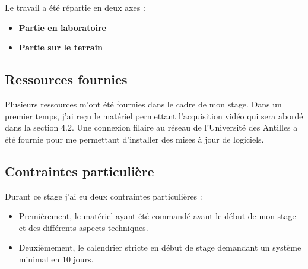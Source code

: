     \begin{flushleft}
        Le travail a été répartie en deux axes :
        \begin{itemize}
            \item  \textbf{Partie en laboratoire}
            \item  \textbf{Partie sur le terrain}
        \end{itemize}
        
        \vspace{0.5cm}      
    \end{flushleft}

    \subsection{Ressources fournies}
    Plusieurs ressources m'ont été fournies dans le cadre de mon stage.
    Dans un premier temps, j'ai reçu le matériel permettant l'acquisition vidéo qui sera abordé dans la section 4.2.
    Une connexion filaire au réseau de l'Université des Antilles a été fournie pour me permettant d'installer des mises à jour de logiciels.

    \subsection{Contraintes particulière}
    Durant ce stage j'ai eu deux contraintes particulières :
    \begin{itemize}
        \item  Premièrement, le matériel ayant été commandé avant le début de mon stage et des différents aspects techniques.
        \item  Deuxièmement, le calendrier stricte en début de stage demandant un système minimal en 10 jours.
    \end{itemize}